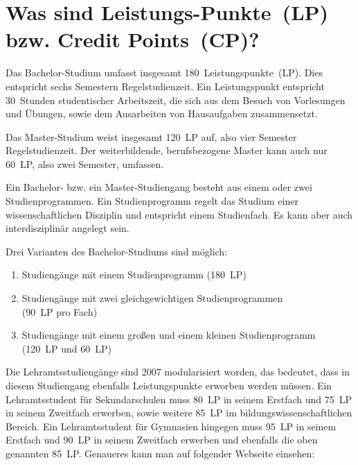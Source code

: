 
\section[Was sind Leistungs-Punkte?]{Was sind Leistungs-Punkte~(LP) bzw. Credit Points~(CP)?}
\label{creditpoints}

Das Bachelor-Studium umfasst insgesamt 180~Leistungspunkte~(LP).
Dies entspricht sechs Semestern Regelstudienzeit.
Ein Leistungspunkt entspricht 30~Stunden studentischer Arbeitszeit, die sich aus dem Besuch von Vorlesungen und Übungen, sowie dem Ausarbeiten von Hausaufgaben zusammensetzt.

Das Master-Studium weist insgesamt 120~LP auf, also vier Semester Regelstudienzeit.
Der weiterbildende, berufsbezogene Master kann auch nur 60~LP, also zwei Semester, umfassen.

Ein Bachelor- bzw. ein Master-Studiengang besteht aus einem oder zwei Studienprogrammen.
Ein Studienprogramm regelt das Studium einer wissenschaftlichen Disziplin und entspricht einem Studienfach.
Es kann aber auch interdisziplinär angelegt sein.

Drei Varianten des Bachelor-Studiums sind möglich:
\begin{enumerate}
    \item Studiengänge mit einem Studienprogramm (180~LP)
    \item Studiengänge mit zwei gleichgewichtigen Studienprogrammen\\
          (90~LP pro Fach)
    \item Studiengänge mit einem großen und einem kleinen Studienprogramm\\
          (120~LP und 60~LP)
\end{enumerate}

Die Lehramtsstudiengänge sind 2007 modularisiert worden, das bedeutet, dass in diesem Studiengang ebenfalls Leistungspunkte erworben werden müssen.
Ein Lehramtsstudent für Sekundarschulen muss 80~LP in seinem Erstfach und 75~LP in seinem Zweitfach erwerben, sowie weitere 85~LP im bildungswissenschaftlichen Bereich.
Ein Lehramtsstudent für Gymnasien hingegen muss 95~LP in seinem Erstfach und 90~LP in seinem Zweitfach erwerben und ebenfalls die oben genannten 85~LP.
Genaueres kann man auf folgender Webseite einsehen:\\[1.0em]
